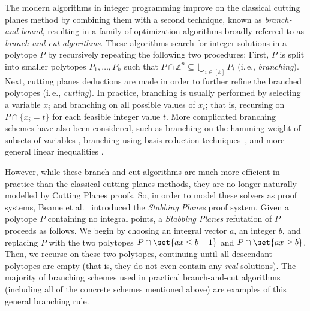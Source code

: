 \documentclass[11pt]{article}
\newcommand{\ie}{i.\,e.}
\begin{document}
The modern algorithms in integer programming improve on the classical cutting planes method by combining them with a second technique, known as \emph{branch-and-bound}, resulting in a family of optimization algorithms broadly referred to as \emph{branch-and-cut algorithms}. 
These algorithms search for integer solutions in a polytope $P$ by recursively repeating the following two procedures: First, $P$ is split into smaller polytopes $P_1,\ldots, P_k$  such that $P \cap \mathbb{Z}^n \subseteq \bigcup_{i\in [k]} P_i$ (\ie, \emph{branching}). 
Next, cutting planes deductions are made in order to further refine the branched polytopes (\ie, \emph{cutting}). 
In practice, branching is usually performed by selecting a variable $x_i$ and branching on all possible values of $x_i$; that is, recursing on $P \cap \{x_i = t\}$ for each feasible integer value $t$.
More complicated branching schemes have also been considered, such as branching on the hamming weight of subsets of variables \cite{FischettiL03}, branching using basis-reduction techniques~\cite{AardalL04,KrishnamoorthyP09,AardalBHLS00}, and more general linear inequalities \cite{OwenM01,mahajanRT09,KaramanovC11}. 

However, while these branch-and-cut algorithms are much more efficient in practice than the classical cutting planes methods, they are no longer naturally modelled by Cutting Planes proofs.
So, in order to model these solvers as proof systems, Beame et al.~\cite{BeameFIKPPR18} introduced the \emph{Stabbing Planes} proof system.
%
%
Given a polytope $P$ containing no integral points, a \emph{Stabbing Planes} refutation of $P$ proceeds as follows.
We begin by choosing an integral vector $a$, an integer $b$, and replacing $P$ with the two polytopes $P \cap \set{ax \leq b-1}$ and $P \cap \set{ax \geq b}$.
Then, we recurse on these two polytopes, continuing until all descendant polytopes are empty (that is, they do not even contain any \emph{real} solutions).
The majority of branching schemes used in practical branch-and-cut algorithms (including all of the concrete schemes mentioned above) are examples of this general branching rule.
\end{document}
